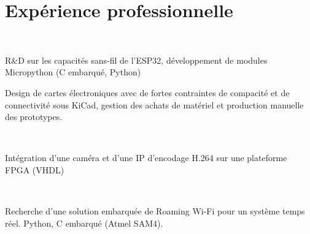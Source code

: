 \documentclass[]{cv-template}
\begin{document}
\hfill
\begin{minipage}[t]{0.65\textwidth} 

\section{Expérience professionnelle}
\\
    \vspace{0.9em} %
\begin{tightemize}
\item R\&D sur les capacités sans-fil de l'ESP32, développement de modules Micropython (C embarqué, Python)
\item Design de cartes électroniques avec de fortes contraintes de compacité et de connectivité sous KiCad, gestion des achats de matériel et production manuelle des prototypes.
\end{tightemize}
\sectionsep

\\
\begin{tightemize}
\item Intégration d'une caméra et d'une IP d'encodage H.264 sur une plateforme FPGA (VHDL)
\end{tightemize}
\sectionsep

\\
\begin{tightemize}
\item Recherche d'une solution embarquée de Roaming Wi-Fi pour un système temps réel. Python, C embarqué (Atmel SAM4).
\end{tightemize}
\sectionsep



\end{minipage}
\end{document}

